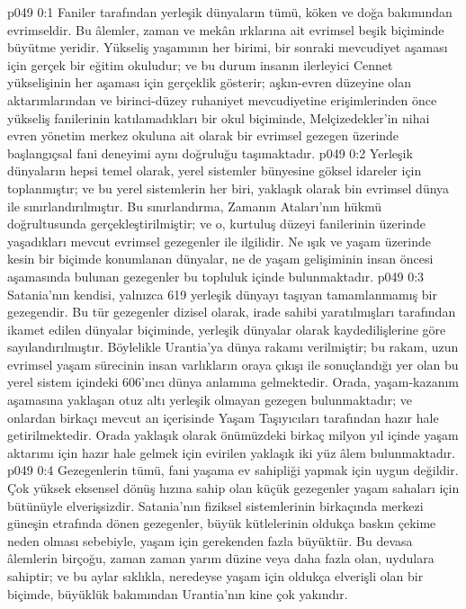 \vs p049 0:1 Faniler tarafından yerleşik dünyaların tümü, köken ve doğa bakımından evrimseldir. Bu âlemler, zaman ve mekân ırklarına ait evrimsel beşik biçiminde büyütme yeridir. Yükseliş yaşamının her birimi, bir sonraki mevcudiyet aşaması için gerçek bir eğitim okuludur; ve bu durum insanın ilerleyici Cennet yükselişinin her aşaması için gerçeklik gösterir; aşkın\hyp{}evren düzeyine olan aktarımlarından ve birinci\hyp{}düzey ruhaniyet mevcudiyetine erişimlerinden önce yükseliş fanilerinin katılamadıkları bir okul biçiminde, Melçizedekler’in nihai evren yönetim merkez okuluna ait olarak bir evrimsel gezegen üzerinde başlangıçsal fani deneyimi aynı doğruluğu taşımaktadır.
\vs p049 0:2 Yerleşik dünyaların hepsi temel olarak, yerel sistemler bünyesine göksel idareler için toplanmıştır; ve bu yerel sistemlerin her biri, yaklaşık olarak bin evrimsel dünya ile sınırlandırılmıştır. Bu sınırlandırma, Zamanın Ataları’nın hükmü doğrultusunda gerçekleştirilmiştir; ve o, kurtuluş düzeyi fanilerinin üzerinde yaşadıkları mevcut evrimsel gezegenler ile ilgilidir. Ne ışık ve yaşam üzerinde kesin bir biçimde konumlanan dünyalar, ne de yaşam gelişiminin insan öncesi aşamasında bulunan gezegenler bu topluluk içinde bulunmaktadır.
\vs p049 0:3 Satania’nın kendisi, yalnızca 619 yerleşik dünyayı taşıyan tamamlanmamış bir gezegendir. Bu tür gezegenler dizisel olarak, irade sahibi yaratılmışları tarafından ikamet edilen dünyalar biçiminde, yerleşik dünyalar olarak kaydedilişlerine göre sayılandırılmıştır. Böylelikle Urantia’ya  dünya rakamı verilmiştir; bu rakam, uzun evrimsel yaşam sürecinin insan varlıkların oraya çıkışı ile sonuçlandığı yer olan bu yerel sistem içindeki 606’ıncı dünya anlamına gelmektedir. Orada, yaşam\hyp{}kazanım aşamasına yaklaşan otuz altı yerleşik olmayan gezegen bulunmaktadır; ve onlardan birkaçı mevcut an içerisinde Yaşam Taşıyıcıları tarafından hazır hale getirilmektedir. Orada yaklaşık olarak önümüzdeki birkaç milyon yıl içinde yaşam aktarımı için hazır hale gelmek için evirilen yaklaşık iki yüz âlem bulunmaktadır.
\vs p049 0:4 Gezegenlerin tümü, fani yaşama ev sahipliği yapmak için uygun değildir. Çok yüksek eksensel dönüş hızına sahip olan küçük gezegenler yaşam sahaları için bütünüyle elverişsizdir. Satania’nın fiziksel sistemlerinin birkaçında merkezi güneşin etrafında dönen gezegenler, büyük kütlelerinin oldukça baskın çekime neden olması sebebiyle, yaşam için gerekenden fazla büyüktür. Bu devasa âlemlerin birçoğu, zaman zaman yarım düzine veya daha fazla olan, uydulara sahiptir; ve bu aylar sıklıkla, neredeyse yaşam için oldukça elverişli olan bir biçimde, büyüklük bakımından Urantia’nın kine çok yakındır.
